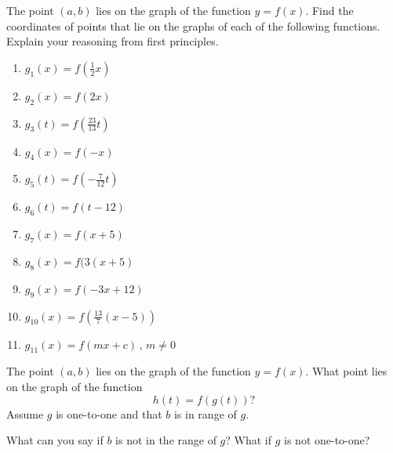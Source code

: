 \documentclass{ximera}
\begin{document}
\begin{question} \label{QmQnwenSW}

The point $(a,b)$ lies on the graph of the function $y=f(x)$. Find the coordinates of points that lie on the graphs of each of the following functions. Explain your reasoning from first principles.

\begin{enumerate}
\item $g_1(x) = f\left( \frac{1}{2}x \right)$

\item $g_2(x) = f(2x)$

\item $g_3(t) = f\left( \frac{23}{13}t \right)$

\item $g_4(x) = f(-x)$

\item $g_5(t) = f\left( -\frac{7}{12}t \right)$

\item $g_6(t) = f(t-12)$

\item $g_7(x) = f(x+5)$

\item $g_8(x) = f(3(x+5)$

\item $g_9(x) = f(-3x + 12)$

\item $g_{10}(x) = f\left(\frac{13}{7} \left( x-5 \right) \right)$

\item $g_{11}(x) = f(mx+c) \, , \, m\neq 0 $
\end{enumerate}
\end{question}

\begin{question} \label{QMENFE3d0}
The point $(a,b)$ lies on the graph of the function $y=f(x)$. What point lies on the graph of the function
\[
       h(t) = f(g(t))?
\]
Assume $g$ is one-to-one and that $b$ is in range of $g$. 

What can you say if $b$ is not in the range of $g$? What if $g$ is not one-to-one?
\end{question}
\end{document}
